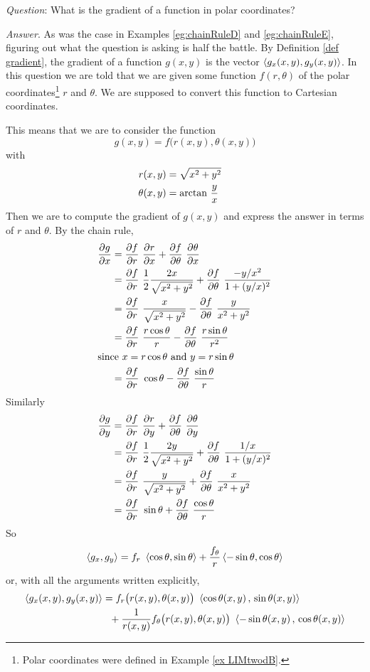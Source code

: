 \begin{eg}\label{eg:chainRuleF}
\noindent\textit{Question}:
What is the gradient of a function in polar coordinates?

\medskip
\noindent\textit{Answer}.
As was the case in Examples \ref{eg:chainRuleD} and \ref{eg:chainRuleE}, figuring 
out what the question is asking is half the battle. By Definition 
\ref{def gradient}, the gradient of a function $g(x,y)$
is the vector $\left< g_x(x,y),g_y(x,y)\right>$. In this question we are told
that we are given some function $f(r,\theta)$ of the polar 
coordinates\footnote{Polar coordinates were defined in 
Example \ref{ex LIMtwodB}.} $r$ and $\theta$. We are supposed to convert 
this function to Cartesian  coordinates. 

This means that we are to consider the function
$$
g(x,y)=f\big(r(x,y),\theta(x,y)\big)
$$
with
\begin{align*}
r(x,y)&=\sqrt{x^2+y^2}\cr
\theta(x,y)&= \arctan\,\frac{y}{x}
\end{align*}
Then we are to compute the gradient of $g(x,y)$ and express the answer
in terms of $r$ and $\theta$. By the chain rule,
\begin{align*}
\pdiff{g}{x}
&=\pdiff{f}{r}\ \pdiff{r}{x}
           +\pdiff{f}{\theta}\  \pdiff{\theta}{x} \\
&=\pdiff{f}{r}\ \frac{1}{2}\frac{2x}{\sqrt{x^2+y^2}}
        +\pdiff{f}{\theta}\ \frac{-y/x^2}{1+(y/x)^2} \\
&=\pdiff{f}{r}\ \frac{x}{\sqrt{x^2+y^2}}
        -\pdiff{f}{\theta}\ \frac{y}{x^2+y^2} \\
&=\pdiff{f}{r}\ \frac{r\cos\theta}{r}
       -\pdiff{f}{\theta}\ \frac{r\sin\theta}{r^2} \\
\intertext{since $x=r\cos\theta$ and $y=r\sin\theta$}
&=\pdiff{f}{r}\ \cos\theta
           -\pdiff{f}{\theta}\ \frac{\sin\theta}{r}
\end{align*}
Similarly
\begin{align*}
\pdiff{g}{y}
&=\pdiff{f}{r}\ \pdiff{r}{y}
           +\pdiff{f}{\theta}\ \pdiff{\theta}{y} \\
&=\pdiff{f}{r}\ \frac{1}{2}\frac{2y}{\sqrt{x^2+y^2}}
         +\pdiff{f}{\theta}\ \frac{1/x}{1+(y/x)^2} \\
&=\pdiff{f}{r}\ \frac{y}{\sqrt{x^2+y^2}}
           +\pdiff{f}{\theta}\ \frac{x}{x^2+y^2} \\
&=\pdiff{f}{r}\ \sin\theta
     +\pdiff{f}{\theta}\ \frac{\cos\theta}{r}
\end{align*}
So
\begin{equation*}
\left< g_x,g_y\right>= f_r\ \left<\cos\theta,\sin\theta\right>
           +\frac{f_\theta}{r}\left<-\sin\theta,\cos\theta\right>
\end{equation*}
or, with all the arguments written explicitly,
\begin{align*}
\llt g_x(x,y),g_y(x,y)\rgt
&=
f_r\big(r(x,y),\theta(x,y)\big)\ \llt\cos\theta(x,y)\,,\,\sin\theta(x,y)\rgt \\
&\ \ +\frac{1}{r(x,y)}f_\theta\big(r(x,y),\theta(x,y)\big)\ 
\llt-\sin\theta(x,y)\,,\,\cos\theta(x,y)\rgt
\end{align*}
\end{eg}

